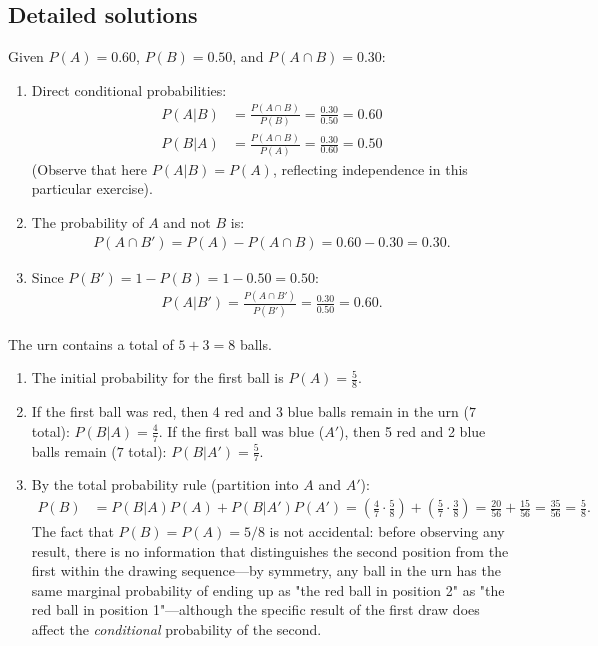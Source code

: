 \subsection*{Detailed solutions}

\begin{solproblema}[prob:8794f31]
	Given $P(A)=0.60$, $P(B)=0.50$, and $P(A \cap B)=0.30$:
	\begin{enumerate}
		\item Direct conditional probabilities:
		\begin{align}
			P(A|B) &= \frac{P(A \cap B)}{P(B)} = \frac{0.30}{0.50} = 0.60 \\
			P(B|A) &= \frac{P(A \cap B)}{P(A)} = \frac{0.30}{0.60} = 0.50
		\end{align}
		(Observe that here $P(A|B)=P(A)$, reflecting independence in this particular exercise).

		\item The probability of $A$ and not $B$ is:
		\begin{align}
			P(A \cap B') = P(A) - P(A \cap B) = 0.60 - 0.30 = 0.30.
		\end{align}

		\item Since $P(B') = 1 - P(B) = 1 - 0.50 = 0.50$:
		\begin{align}
			P(A|B') = \frac{P(A \cap B')}{P(B')} = \frac{0.30}{0.50} = 0.60.
		\end{align}
	\end{enumerate}
\end{solproblema}

\begin{solproblema}[prob:cf929e4]
	The urn contains a total of $5 + 3 = 8$ balls.
	\begin{enumerate}
		\item The initial probability for the first ball is $P(A) = \frac{5}{8}$.
		\item If the first ball was red, then 4 red and 3 blue balls remain in the urn ($7$ total): $P(B|A) = \frac{4}{7}$. If the first ball was blue ($A'$), then 5 red and 2 blue balls remain ($7$ total): $P(B|A') = \frac{5}{7}$.
		\item By the total probability rule (partition into $A$ and $A'$):
		\begin{align}
			P(B) &= P(B|A)P(A) + P(B|A')P(A') = \left(\frac{4}{7} \cdot \frac{5}{8}\right) + \left(\frac{5}{7} \cdot \frac{3}{8}\right) = \frac{20}{56} + \frac{15}{56} = \frac{35}{56} = \frac{5}{8}.
		\end{align}
		The fact that $P(B)=P(A)=5/8$ is not accidental: before observing any result, there is no information that distinguishes the second position from the first within the drawing sequence---by symmetry, any ball in the urn has the same marginal probability of ending up as "the red ball in position 2" as "the red ball in position 1"---although the specific result of the first draw does affect the \emph{conditional} probability of the second.
	\end{enumerate}
\end{solproblema}

